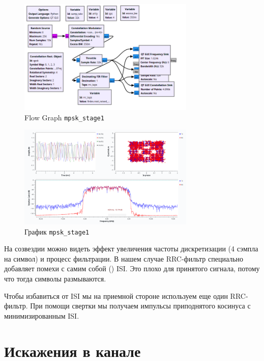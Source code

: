 \documentclass[a4paper,12pt]{report}
\begin{document}
    \begin{figure}[H]
        \centering
        \includegraphics[width=0.75\textwidth]{images/mpsk_stage1_fg.png}
        \caption{Flow Graph \texttt{mpsk\_stage1}}
        \label{fig:mpsk_stage1_fg}
    \end{figure}
    
    \begin{figure}[H]
        \centering
        \includegraphics[width=0.75\textwidth]{images/mpsk_stage1_plot.png}
        \caption{График \texttt{mpsk\_stage1}}
        \label{fig:mpsk_stage1_plot}
    \end{figure}
    
    На созвездии можно видеть эффект увеличения частоты дискретизации (4 сэмпла на символ) и процесс фильтрации. В нашем случае RRC-фильтр специально добавляет помехи с самим собой () ISI. Это плохо для принятого сигнала, потому что тогда символы размываются.
    
    Чтобы избавиться от ISI мы на приемной стороне используем еще один RRC-фильтр. При помощи свертки мы получаем импульсы приподнятого косинуса с минимизированным ISI.
    
    \chapter{Искажения в канале}
    
\end{document}
